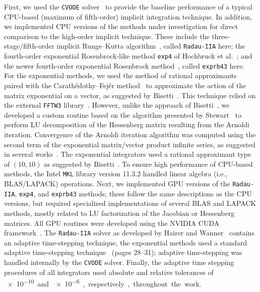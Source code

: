 \documentclass[final,twocolumn]{elsarticle}
\begin{document}
First, we used the \texttt{CVODE} solver~\cite{Hindmarsh:2005hg} to provide the baseline performance of a typical CPU-based (maximum of fifth-order) implicit integration technique.
In addition, we implemented CPU versions of the methods under investigation for direct comparison to the high-order implicit technique.
These include the three-stage/fifth-order implicit Runge--Kutta algorithm~\cite{wanner1991solving}, called \texttt{Radau-IIA} here; the fourth-order exponential Rosenbrock-like method \texttt{exp4} of Hochbruck et al.~\cite{Hochbruck:1998}; and the newer fourth-order exponential Rosenbrock method~\cite{Hockbruck:2009}, called \texttt{exprb43} here.
For the exponential methods, we used the method of rational approximants~\cite{gallopoulos:1992} paired with the Carath\'edothy--Fej\'er method~\cite{trefethen:2006} to approximate the action of the matrix exponential on a vector, as suggested by Bisetti~\cite{Bisetti:2012jw}.
This technique relied on the external \texttt{FFTW3} library~\cite{frigo2005design}.
However, unlike the approach of Bisetti~\cite{Bisetti:2012jw}, we developed a custom routine based on the algorithm presented by Stewart~\cite{stewart:1998} to perform LU decomposition of the Hessenberg matrix resulting from the Arnoldi iteration.
Convergence of the Arnoldi iteration algorithm was computed using the second term of the exponential matrix\slash vector product infinite series, as suggested in several works~\cite{Bisetti:2012jw,saad:1992}.
The exponential integrators used a rational approximant type of $\left(10,10\right)$ as suggested by Bisetti~\cite{Bisetti:2012jw}.
To ensure high performance of CPU-based methods, the Intel \texttt{MKL} library version 11.3.2 handled linear algebra (i.e., BLAS/LAPACK) operations.
Next, we implemented GPU versions of the \texttt{Radau-IIA}, \texttt{exp4}, and \texttt{exprb43} methods; these follow the same descriptions as the CPU versions, but required specialized implementations of several BLAS and LAPACK methods, mostly related to LU factorization of the Jacobian or Hessenberg matrices.
All GPU routines were developed using the NVIDIA CUDA framework~\cite{Buck:2008aa,NVIDIA:2015aa}.
The \texttt{Radau-IIA} solver as developed by Hairer and Wanner~\cite{wanner1991solving} contains an adaptive time-stepping technique, the exponential methods used a standard adaptive time-stepping technique~\cite{wanner1991solving} (pages 28--31); adaptive time-stepping was handled internally by the \texttt{CVODE} solver.
Finally, the adaptive time stepping procedures of all integrators used absolute and relative tolerances of \SI{e-10} and \SI{e-6}, respectively, throughout the work.
\end{document}
